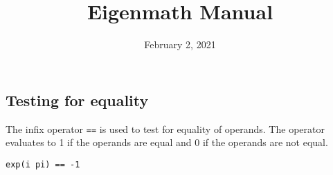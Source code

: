 \documentclass[11pt]{article}
\title{Eigenmath Manual}
\author{}
\date{February 2, 2021}
\begin{document}
\maketitle

\tableofcontents

\newpage





\subsection{Testing for equality}
The infix operator \verb$==$ is used to test for equality of operands.
The operator evaluates to 1 if the operands are equal and 0 if the operands are not equal.

\begin{Verbatim}[formatcom=\color{blue}]
exp(i pi) == -1
\end{Verbatim}


\newpage







\newpage



























\newpage



\newpage


\end{document}
